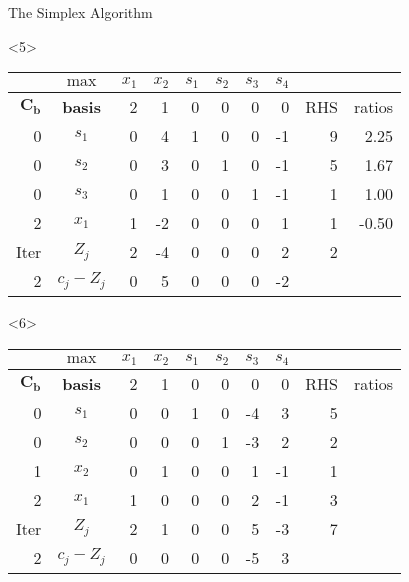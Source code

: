 \begin{frameExample}{The Simplex Algorithm}{}
\begin{onlyenv}<5>
    {\centering
      \begin{tabular}{rc|rrrrrr|rr}
  &  $\max$ & $x_1$ & $x_2$ & $s_1$ &$ s_2$ & $s_3$ & $s_4$ & & \\
  \toprule
$\mathbf{C_b}$ & \textbf{basis} & 2 & 1 & 0 & 0 & 0 & 0 & RHS & ratios \\
  \midrule
0 & $s_1$ & 0 & 4 & 1 & 0 & 0 & -1 & 9 & 2.25 \\
0 & $s_2$ & 0 & 3 & 0 & 1 & 0 & -1 & 5 & 1.67 \\
0 & $s_3$ & 0 & \cellcolor{yellow}1 & 0 & 0 & 1 & -1 & 1 & 1.00 \\
        2 & $x_1$ & 1 & -2 & 0 & 0 & 0 & 1 & 1 & -0.50 \\
        \midrule
Iter & $Z_j$ & 2 & -4 & 0 & 0 & 0 & 2 & 2 &  \\
2 & $c_j - Z_j$ & 0 & 5 & 0 & 0 & 0 & -2 &  & 
\end{tabular}
  \par}
\end{onlyenv}

\begin{onlyenv}<6>
    {\centering
      \begin{tabular}{rc|rrrrrr|rr}
  &  $\max$ & $x_1$ & $x_2$ & $s_1$ &$ s_2$ & $s_3$ & $s_4$ & & \\
  \toprule
$\mathbf{C_b}$ & \textbf{basis} & 2 & 1 & 0 & 0 & 0 & 0 & RHS & ratios \\
  \midrule
0 & $s_1$ & 0 & 0 & 1 & 0 & -4 & 3 & 5 &  \\
0 & $s_2$ & 0 & 0 & 0 & 1 & -3 & 2 & 2 &  \\
1 & $x_2$ & 0 & \cellcolor{yellow}1 & 0 & 0 & 1 & -1 & 1 &  \\
        2 & $x_1$ & 1 & 0 & 0 & 0 & 2 & -1 & 3 &  \\
        \midrule
Iter & $Z_j$ & 2 & 1 & 0 & 0 & 5 & -3 & 7 &  \\
2 & $c_j - Z_j$ & 0 & 0 & 0 & 0 & -5 & 3 &  & 
\end{tabular}
  \par}
\end{onlyenv}


\end{frameExample}
